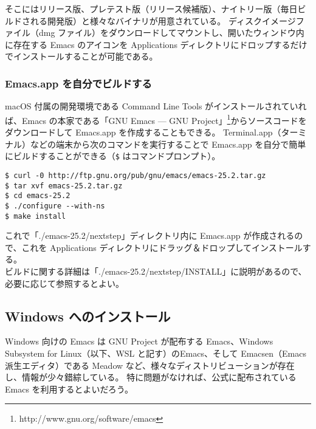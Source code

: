 そこにはリリース版、プレテスト版（リリース候補版）、ナイトリー版（毎日ビルドされる開発版）と様々なバイナリが用意されている。
ディスクイメージファイル（dmg ファイル）をダウンロードしてマウントし、開いたウィンドウ内に存在する Emacs のアイコンを Applications ディレクトリにドロップするだけでインストールすることが可能である。
\subsubsection{Emacs.app を自分でビルドする}
macOS 付属の開発環境である Command Line Tools がインストールされていれば、Emacs の本家である「GNU Emacs --- GNU Project」\footnote{http://www.gnu.org/software/emacs}からソースコードをダウンロードして Emacs.app を作成することもできる。\enlargethispage{1.00zw}
Terminal.app（ターミナル）などの端末から次のコマンドを実行することで Emacs.app を自分で簡単にビルドすることができる（\texttt{\$} はコマンドプロンプト）。
\begin{mdframed}[roundcorner=0.50zw,leftmargin=3.00zw,rightmargin=3.00zw,skipabove=0.40zw,skipbelow=0.40zw,innertopmargin=4.00pt,innerbottommargin=4.00pt,innerleftmargin=5.00pt,innerrightmargin=5.00pt,linecolor=gray!090,linewidth=0.50pt,backgroundcolor=gray!90]\color{gray!10}
\begin{verbatim}
$ curl -0 http://ftp.gnu.org/pub/gnu/emacs/emacs-25.2.tar.gz
$ tar xvf emacs-25.2.tar.gz
$ cd emacs-25.2
$ ./configure --with-ns
$ make install
\end{verbatim}
\end{mdframed}
これで「./emacs-25.2/nextstep」ディレクトリ内に Emacs.app が作成されるので、これを Applications ディレクトリにドラッグ＆ドロップしてインストールする。\\

ビルドに関する詳細は「./emacs-25.2/nextstep/INSTALL」に説明があるので、必要に応じて参照するとよい。
\subsection{Windows へのインストール}
Windows 向けの Emacs は GNU Project が配布する Emacs、Windows Subsystem for Linux（以下、WSL と記す）のEmacs、そして Emacsen（Emacs 派生エディタ）である Meadow など、様々なディストリビューションが存在し、情報が少々錯綜している。
特に問題がなければ、公式に配布されている Emacs  を利用するとよいだろう。\\


